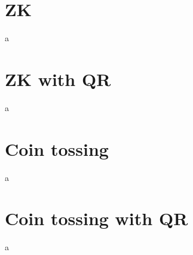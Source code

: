 \documentclass{article}
\begin{document}
\section{ZK}
\begin{paragraph}
    a 
\end{paragraph}

\section{ZK with QR}
\begin{paragraph}
    a 
\end{paragraph}

\section{Coin tossing}
\begin{paragraph}
    a 
\end{paragraph}

\section{Coin tossing with QR}
\begin{paragraph}
    a 
\end{paragraph}
\end{document}
